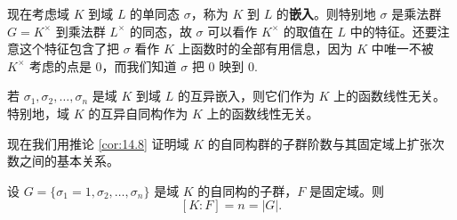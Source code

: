 现在考虑域 \(K\) 到域 \(L\) 的单同态 \(\sigma\)，称为 \(K\) 到 \(L\) 的\textbf{嵌入}。则特别地 \(\sigma\) 是乘法群 \(G = K^\times\) 到乘法群 \(L^\times\) 的同态，故 \(\sigma\) 可以看作 \(K^\times\) 的取值在 \(L\) 中的特征。还要注意这个特征包含了把 \(\sigma\) 看作 \(K\) 上函数时的全部有用信息，因为 \(K\) 中唯一不被 \(K^\times\) 考虑的点是 0，而我们知道 \(\sigma\) 把 0 映到 0.

\begin{corollary}\label{cor:14.8}
若 \(\sigma_1, \sigma_2, \ldots, \sigma_n\) 是域 \(K\) 到域 \(L\) 的互异嵌入，则它们作为 \(K\) 上的函数线性无关。特别地，域 \(K\) 的互异自同构作为 \(K\) 上的函数线性无关。
\end{corollary}

现在我们用推论 \ref{cor:14.8} 证明域 \(K\) 的自同构群的子群阶数与其固定域上扩张次数之间的基本关系。

\begin{theorem}\label{thm:14.9}
设 \(G = \{\sigma_1 = 1, \sigma_2, \ldots, \sigma_n\}\) 是域 \(K\) 的自同构的子群，\(F\) 是固定域。则
\[
[K:F] = n = |G|.
\]
\end{theorem}

